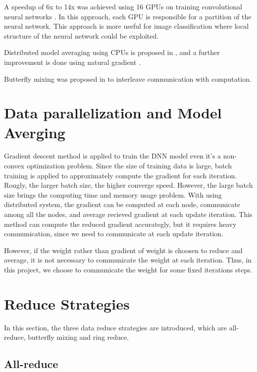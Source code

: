 \documentclass{article}
\begin{document}
A speedup of 6x to 14x was achieved using 16 GPUs on training convolutional neural networks \cite{coates2013deep}. In this approach,
each GPU is responsible for a partition of the neural network. This approach is more useful for image classification where 
local structure of the neural network could be exploited.

Distributed model averaging using CPUs is proposed in \cite{zhang2014improving},
and a further improvement is done using natural gradient \cite{povey2014parallel}.


Butterfly mixing was proposed in \cite{zhao2013butterfly} to interleave communication with computation.


\section{Data parallelization and Model Averging}
Gradient descent method is applied to train the DNN model even it's a non-convex optimization problem. 
Since the size of training data is large, batch training is applied to approximately compute the 
gradient for each iteration. Rougly, the larger batch size, the higher converge speed. However, 
the large batch size brings the computing time and memory usage problem. With using distributed 
system, the gradient can be computed at each node, communicate among all the nodes, and average 
recieved gradient at each update iteration. This method can compute the reduced gradient 
accurategly, but it requires heavy communication, since we need to communicate at each update iteration.

However, if the weight rather than gradient of weight is choosen to reduce and average, 
it is not necessary to communicate the weight at each iteration. Thus, in this project, 
we choose to communicate the weight for some fixed iterations steps. 

\section{Reduce Strategies}
In this section, the three data reduce strategies are introduced, which are all-reduce, 
butterfly mixing and ring reduce.

\subsection{All-reduce}
\end{document}
